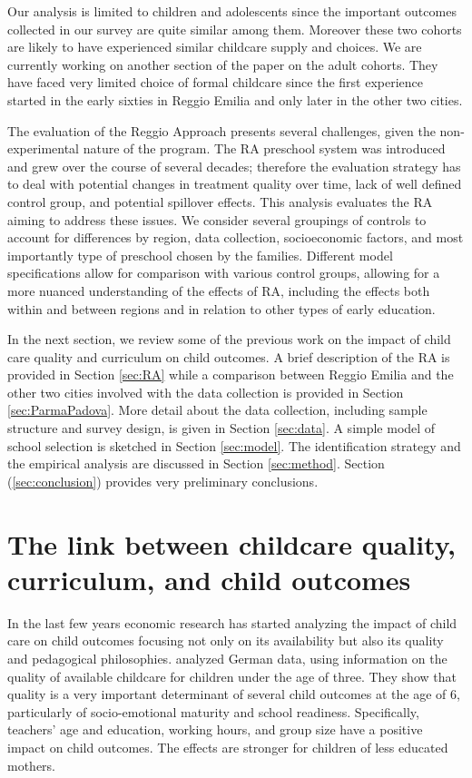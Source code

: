 \documentclass[12pt]{article}
\begin{document}
Our analysis is limited to children and adolescents since the important outcomes collected in our survey are quite similar among them. Moreover these two cohorts are likely to have experienced similar childcare supply and choices. We are currently working on another section of the paper on the adult cohorts. They have faced very limited choice of formal childcare since the first experience started in the early sixties in Reggio Emilia and only later in the other two cities.

The evaluation of the Reggio Approach presents several challenges, given the non-experimental nature of the program. The RA preschool system was introduced and grew over the course of several decades; therefore the evaluation strategy has to deal with potential changes in treatment quality over time, lack of well defined control group, and potential spillover effects. This analysis evaluates the RA aiming to address these issues. We consider several groupings of controls to account for differences by region, data collection, socioeconomic factors, and most importantly type of preschool chosen by the families. Different model specifications allow for comparison with various control groups, allowing for a more nuanced understanding of the effects of RA, including the effects both within and between regions and in relation to other types of early education.

In the next section, we review some of the previous work on the impact of child care quality and curriculum on child outcomes. A brief description of the RA is provided in Section \ref{sec:RA} while a comparison between Reggio Emilia and the other two cities involved with the data collection is provided in Section \ref{sec:ParmaPadova}. More detail about the data collection, including sample structure and survey design, is given in Section \ref{sec:data}. A simple model of school selection is sketched in Section \ref{sec:model}. The identification strategy and the empirical analysis are discussed in Section \ref{sec:method}. Section (\ref{sec:conclusion}) provides very preliminary conclusions.

\bigskip

\section{The link between childcare quality, curriculum, and child outcomes} \label{sec:lit}

In the last few years economic research has started analyzing the impact of child care on child outcomes focusing not only on its availability but also its quality and pedagogical philosophies. \cite{Felfe2015a} analyzed German data, using information on the quality of available childcare for children under the age of three. They show that quality is a very important determinant of several child outcomes at the age of 6, particularly of socio-emotional maturity and school readiness. Specifically, teachers' age and education, working hours, and group size have a positive impact on child outcomes. The effects are stronger for children of less educated mothers.
\end{document}
